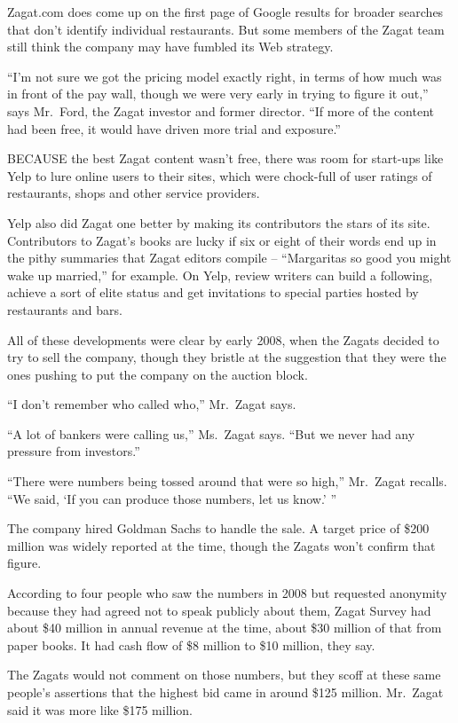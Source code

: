 ﻿\documentclass[12pt]{article}
\begin{document}
Zagat.com does come up on the first page of Google results for broader searches that don't identify
individual restaurants. But some members of the Zagat team still think the company may have fumbled
its Web strategy.

``I'm not sure we got the pricing model exactly right, in terms of how much was in front of the pay
wall, though we were very early in trying to figure it out,'' says Mr.~Ford, the Zagat investor and
former director. ``If more of the content had been free, it would have driven more trial and
exposure.''

BECAUSE the best Zagat content wasn't free, there was room for start-ups like Yelp to lure online
users to their sites, which were chock-full of user ratings of restaurants, shops and other service
providers.

Yelp also did Zagat one better by making its contributors the stars of its site. Contributors to
Zagat's books are lucky if six or eight of their words end up in the pithy summaries that Zagat
editors compile -- ``Margaritas so good you might wake up married,'' for example. On Yelp, review
writers can build a following, achieve a sort of elite status and get invitations to special parties
hosted by restaurants and bars.

All of these developments were clear by early 2008, when the Zagats decided to try to sell the
company, though they bristle at the suggestion that they were the ones pushing to put the company on
the auction block.

``I don't remember who called who,'' Mr.~Zagat says.

``A lot of bankers were calling us,'' Ms.~Zagat says. ``But we never had any pressure from
investors.''

``There were numbers being tossed around that were so high,'' Mr.~Zagat recalls. ``We said, `If you
can produce those numbers, let us know.' ''

The company hired Goldman Sachs to handle the sale. A target price of \$200 million was widely
reported at the time, though the Zagats won't confirm that figure.

According to four people who saw the numbers in 2008 but requested anonymity because they had agreed
not to speak publicly about them, Zagat Survey had about \$40 million in annual revenue at the time,
about \$30 million of that from paper books. It had cash flow of \$8 million to \$10 million, they
say.

The Zagats would not comment on those numbers, but they scoff at these same people's assertions that
the highest bid came in around \$125 million. Mr.~Zagat said it was more like \$175 million.
\end{document}
